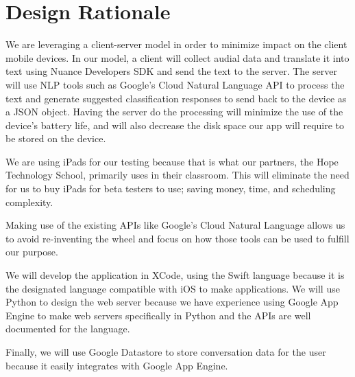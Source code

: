 \chapter{Design Rationale}\label{designRationale}

We are leveraging a client-server model in order to minimize impact on the client mobile devices. In our model, a client will collect audial data and translate it into text using Nuance Developers SDK and send the text to the server. The server will use NLP tools such as Google's Cloud Natural Language API to process the text and generate suggested classification responses to send back to the device as a JSON object. Having the server do the processing will minimize the use of the device's battery life, and will also decrease the disk space our app will require to be stored on the device. 

We are using iPads for our testing because that is what our partners, the Hope Technology School, primarily uses in their classroom. This will eliminate the need for us to buy iPads for beta testers to use; saving money, time, and scheduling complexity.

Making use of the existing APIs like Google's Cloud Natural Language allows us to avoid re-inventing the wheel and focus on how those tools can be used to fulfill our purpose. 

We will develop the application in XCode, using the Swift language because it is the designated language compatible with iOS to make applications. We will use Python to design the web server because we have experience using Google App Engine to make web servers specifically in Python and the APIs are well documented for the language.

Finally, we will use Google Datastore to store conversation data for the user because it easily integrates with Google App Engine.
